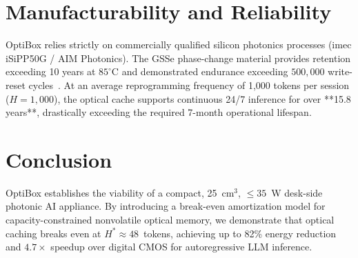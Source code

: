 \documentclass[conference]{IEEEtran}
\begin{document}
\section{Manufacturability and Reliability}
OptiBox relies strictly on commercially qualified silicon photonics processes (imec iSiPP50G / AIM Photonics). The GSSe phase-change material provides retention exceeding 10 years at $85^\circ\text{C}$ and demonstrated endurance exceeding $500,000$ write-reset cycles~\cite{Meng2023}. At an average reprogramming frequency of 1,000 tokens per session ($H=1,000$), the optical cache supports continuous 24/7 inference for over **15.8 years**, drastically exceeding the required 7-month operational lifespan.

\section{Conclusion}
OptiBox establishes the viability of a compact, 25~cm$^3$, $\le 35$~W desk-side photonic AI appliance. By introducing a break-even amortization model for capacity-constrained nonvolatile optical memory, we demonstrate that optical caching breaks even at $H^* \approx 48$~tokens, achieving up to 82\% energy reduction and $4.7\times$ speedup over digital CMOS for autoregressive LLM inference.
\end{document}

